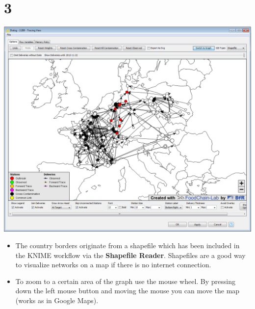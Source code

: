 \documentclass[10pt]{beamer}
\begin{document}
\section{3}
\begin{frame}
	\begin{center}
  		\includegraphics[height=0.6\textheight]{3.png}
	\end{center}
	\begin{itemize}
		\item The country borders originate from a shapefile which has been included in the KNIME workflow via the \textbf{Shapefile Reader}. Shapefiles are a good way to visualize networks on a map if there is no internet connection.
		\item To zoom to a certain area of the graph use the mouse wheel. By pressing down the left mouse button and moving the mouse you can move the map (works as in Google Maps).
	\end{itemize}
\end{frame}
\end{document}
